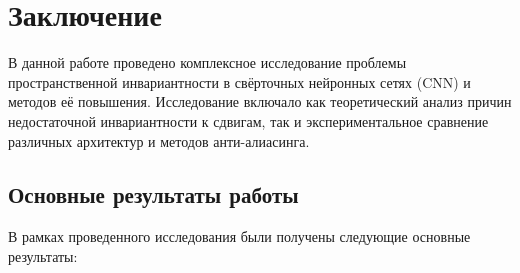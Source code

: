 \chapter{Заключение} \label{conclusion}

В данной работе проведено комплексное исследование проблемы пространственной инвариантности в свёрточных нейронных сетях (CNN) и методов её повышения. Исследование включало как теоретический анализ причин недостаточной инвариантности к сдвигам, так и экспериментальное сравнение различных архитектур и методов анти-алиасинга.

\section{Основные результаты работы}
\label{conclusion:results}

В рамках проведенного исследования были получены следующие основные результаты:

